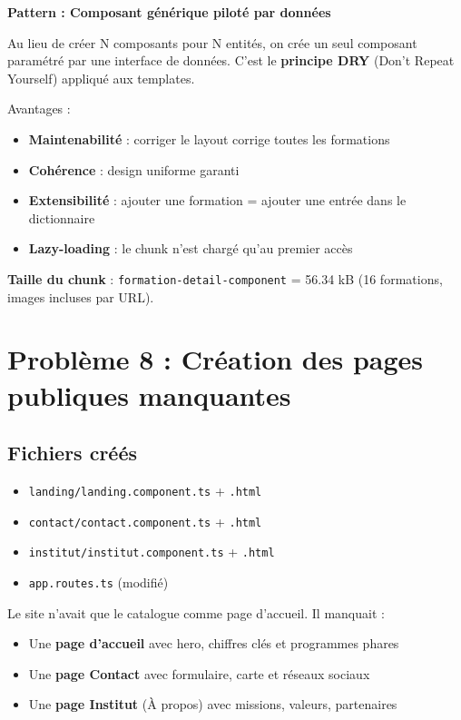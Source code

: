 \documentclass[a4paper,12pt,french]{article}
\begin{document}
\begin{lessonbox}
\textbf{Pattern : Composant générique piloté par données}

Au lieu de créer N composants pour N entités, on crée un seul composant paramétré par une interface de données. C'est le \textbf{principe DRY} (Don't Repeat Yourself) appliqué aux templates.

Avantages :
\begin{itemize}
    \item \textbf{Maintenabilité} : corriger le layout corrige toutes les formations
    \item \textbf{Cohérence} : design uniforme garanti
    \item \textbf{Extensibilité} : ajouter une formation = ajouter une entrée dans le dictionnaire
    \item \textbf{Lazy-loading} : le chunk n'est chargé qu'au premier accès
\end{itemize}

\textbf{Taille du chunk} : \texttt{formation-detail-component} = 56.34 kB (16 formations, images incluses par URL).
\end{lessonbox}

\newpage

\section{Problème 8 : Création des pages publiques manquantes}

\subsection{Fichiers créés}
\begin{itemize}
    \item \texttt{landing/landing.component.ts} + \texttt{.html}
    \item \texttt{contact/contact.component.ts} + \texttt{.html}
    \item \texttt{institut/institut.component.ts} + \texttt{.html}
    \item \texttt{app.routes.ts} (modifié)
\end{itemize}

\begin{problembox}
Le site n'avait que le catalogue comme page d'accueil. Il manquait :
\begin{itemize}
    \item Une \textbf{page d'accueil} avec hero, chiffres clés et programmes phares
    \item Une \textbf{page Contact} avec formulaire, carte et réseaux sociaux
    \item Une \textbf{page Institut} (À propos) avec missions, valeurs, partenaires
\end{itemize}
\end{problembox}
\end{document}
